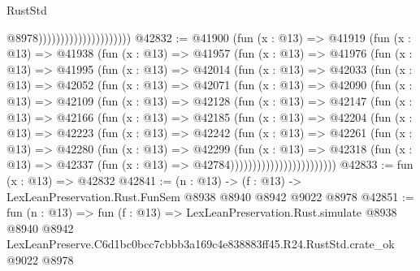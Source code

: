 \begin{lexlean}{RustStd}
\begin{coremodule}
                                              @8978)))))))))))))))))))))
@42832 := @41900
    (fun (x : @13) =>
    @41919
      (fun (x : @13) =>
      @41938
        (fun (x : @13) =>
        @41957
          (fun (x : @13) =>
          @41976
            (fun (x : @13) =>
            @41995
              (fun (x : @13) =>
              @42014
                (fun (x : @13) =>
                @42033
                  (fun (x : @13) =>
                  @42052
                    (fun (x : @13) =>
                    @42071
                      (fun (x : @13) =>
                      @42090
                        (fun (x : @13) =>
                        @42109
                          (fun (x : @13) =>
                          @42128
                            (fun (x : @13) =>
                            @42147
                              (fun (x : @13) =>
                              @42166
                                (fun (x : @13) =>
                                @42185
                                  (fun (x : @13) =>
                                  @42204
                                    (fun (x : @13) =>
                                    @42223
                                      (fun (x : @13) =>
                                      @42242
                                        (fun (x : @13) =>
                                        @42261
                                          (fun (x : @13) =>
                                          @42280
                                            (fun (x : @13) =>
                                            @42299
                                              (fun (x : @13) =>
                                              @42318
                                                (fun (x : @13) =>
                                                @42337
                                                  (fun (x : @13) => @42784))))))))))))))))))))))))
@42833 := fun (x : @13) => @42832
@42841 := (n : @13) -> (f : @13) -> LexLeanPreservation.Rust.FunSem @8938 @8940 @8942 @9022 @8978
@42851 := fun (n : @13) =>
  fun (f : @13) =>
  LexLeanPreservation.Rust.simulate
    @8938
    @8940
    @8942
    LexLeanPreserve.C6d1bc0bcc7cbbb3a169c4e838883ff45.R24.RustStd.crate_ok
    @9022
    @8978
\end{coremodule}
\end{lexlean}
